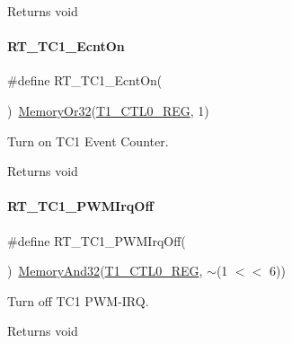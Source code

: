 \begin{DoxyReturn}{Returns}
void 
\end{DoxyReturn}
\mbox{\label{a00044_add9b6f778a744d79226f5165a04a38d9}} 
\paragraph{\texorpdfstring{R\+T\+\_\+\+T\+C1\+\_\+\+Ecnt\+On}{RT\_TC1\_EcntOn}}
{\footnotesize\ttfamily \#define R\+T\+\_\+\+T\+C1\+\_\+\+Ecnt\+On(\begin{DoxyParamCaption}{ }\end{DoxyParamCaption})~\mbox{\hyperlink{a00020_a27874a97deab7cecdde5ddecf466e31e}{Memory\+Or32}}(\mbox{\hyperlink{a00020_adadaa0ab1ebbd7ba9b70dfd24c3ed44da38632250c2e72df96fcaa3f8bd8ecc5e}{T1\+\_\+\+C\+T\+L0\+\_\+\+R\+EG}}, 1)}



Turn on T\+C1 Event Counter. 

\begin{DoxyReturn}{Returns}
void 
\end{DoxyReturn}
\mbox{\label{a00044_a1c33903adfe470964d7eb5126c4ce7d4}} 
\paragraph{\texorpdfstring{R\+T\+\_\+\+T\+C1\+\_\+\+P\+W\+M\+Irq\+Off}{RT\_TC1\_PWMIrqOff}}
{\footnotesize\ttfamily \#define R\+T\+\_\+\+T\+C1\+\_\+\+P\+W\+M\+Irq\+Off(\begin{DoxyParamCaption}{ }\end{DoxyParamCaption})~\mbox{\hyperlink{a00020_ad87cedffcaadc51db22594fce55173d4}{Memory\+And32}}(\mbox{\hyperlink{a00020_adadaa0ab1ebbd7ba9b70dfd24c3ed44da38632250c2e72df96fcaa3f8bd8ecc5e}{T1\+\_\+\+C\+T\+L0\+\_\+\+R\+EG}}, $\sim$(1 $<$$<$ 6))}



Turn off T\+C1 P\+W\+M-\/\+I\+RQ. 

\begin{DoxyReturn}{Returns}
void 
\end{DoxyReturn}
\mbox{\label{a00044_a61477182241a8629176801cca44ce09a}} 
